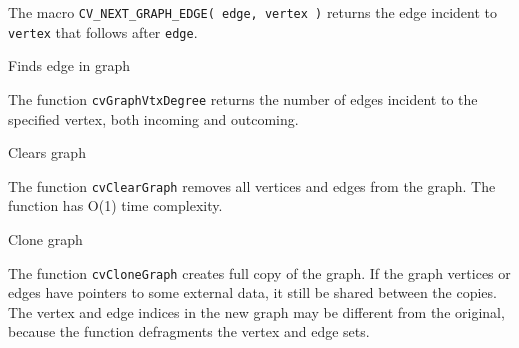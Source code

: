 The macro \texttt{CV\_NEXT\_GRAPH\_EDGE( edge, vertex )} returns the edge incident to \texttt{vertex} that follows after \texttt{edge}.

\label{GraphVtxDegreeByPtr}

Finds edge in graph


\begin{description}
\end{description}

The function \texttt{cvGraphVtxDegree} returns the number of edges incident to the specified vertex, both incoming and outcoming.


\label{ClearGraph}

Clears graph


\begin{description}
\end{description}

The function \texttt{cvClearGraph} removes all vertices and edges from the graph. The function has O(1) time complexity.

\label{CloneGraph}

Clone graph


\begin{description}
\end{description}


The function \texttt{cvCloneGraph} creates full copy of the graph. If the
graph vertices or edges have pointers to some external data, it still be
shared between the copies. The vertex and edge indices in the new graph
may be different from the original, because the function defragments
the vertex and edge sets.



